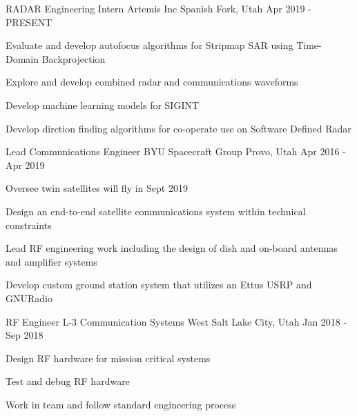 

\begin{cventries}
    \cventry
    {RADAR Engineering Intern} %
    {Artemis Inc} %
    {Spanish Fork, Utah} %
    {Apr 2019 - PRESENT} %
    {
        \begin{cvitems} %
        \item {Evaluate and develop autofocus algorithms for Stripmap SAR using Time-Domain Backprojection}
        \item {Explore and develop combined radar and communications waveforms}
        \item {Develop machine learning models for SIGINT}
        \item {Develop dirction finding algorithms for co-operate use on Software Defined Radar}
        \end{cvitems}
    }

    \cventry
    {Lead Communications Engineer} %
    {BYU Spacecraft Group} %
    {Provo, Utah} %
    {Apr 2016 - Apr 2019} %
    {
        \begin{cvitems} %
        \item {Oversee twin satellites will fly in Sept 2019}
        \item {Design an end-to-end satellite communications system within technical constraints}
        \item {Lead RF engineering work including the design of dish and on-board antennas and amplifier systems}
        \item {Develop custom ground station system that utilizes an Ettus USRP and GNURadio}
        \end{cvitems}
    }

    \cventry
    {RF Engineer} %
    {L-3 Communication Systems West} %
    {Salt Lake City, Utah} %
    {Jan 2018 - Sep 2018} %
    {
        \begin{cvitems} %
        \item {Design RF hardware for mission critical systems}
        \item {Test and debug RF hardware}
        \item {Work in team and follow standard engineering process}
        \end{cvitems}
    }


\end{cventries}
